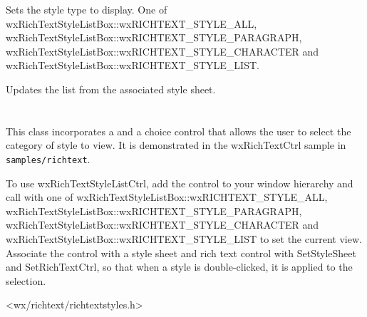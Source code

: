 \label{wxrichtextstylelistboxsetstyletype}


Sets the style type to display. One of wxRichTextStyleListBox::wxRICHTEXT\_STYLE\_ALL, wxRichTextStyleListBox::wxRICHTEXT\_STYLE\_PARAGRAPH,
wxRichTextStyleListBox::wxRICHTEXT\_STYLE\_CHARACTER and wxRichTextStyleListBox::wxRICHTEXT\_STYLE\_LIST.

\label{wxrichtextstylelistboxupdatestyles}


Updates the list from the associated style sheet.


\section{}\label{wxrichtextstylelistctrl}

This class incorporates a  and
a choice control that allows the user to select the category of style to view.
It is demonstrated in the wxRichTextCtrl sample in {\tt samples/richtext}.

To use wxRichTextStyleListCtrl, add the control to your window hierarchy and
call  with
one of wxRichTextStyleListBox::wxRICHTEXT\_STYLE\_ALL, wxRichTextStyleListBox::wxRICHTEXT\_STYLE\_PARAGRAPH,
wxRichTextStyleListBox::wxRICHTEXT\_STYLE\_CHARACTER and wxRichTextStyleListBox::wxRICHTEXT\_STYLE\_LIST to set the current view.
Associate the control with a style sheet and rich text control with SetStyleSheet and SetRichTextCtrl,
so that when a style is double-clicked, it is applied to the selection.


\twocolwidtha{5cm}
\begin{twocollist}\itemsep=0pt
\end{twocollist}




<wx/richtext/richtextstyles.h>

